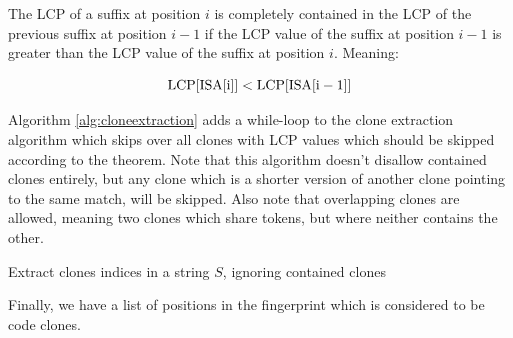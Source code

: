 \begin{theorem} 

    The LCP of a suffix at position $i$ is completely contained in the LCP of the previous
    suffix at position $i - 1$ if the LCP value of the suffix at position $i - 1$ is
    greater than the LCP value of the suffix at position $i$. Meaning:

    $$
    \mathrm{LCP}[{\mathrm{ISA}[{\mathrm{i}}]}] < \mathrm{LCP}[{\mathrm{ISA}[{\mathrm{i} - 1}]}]
    $$

\end{theorem}


Algorithm \ref{alg:cloneextraction} adds a while-loop to the clone extraction algorithm
which skips over all clones with LCP values which should be skipped according to the
theorem. Note that this algorithm doesn't disallow contained clones entirely, but any
clone which is a shorter version of another clone pointing to the same match, will be
skipped. Also note that overlapping clones are allowed, meaning two clones which share
tokens, but where neither contains the other.

\begin{algorithm}[t]
  \SetAlgoLined\DontPrintSemicolon

  \vspace{0.5cm}
  \caption{Extract clones indices in a string $S$, ignoring contained clones}
  \label{alg:cloneextraction}
\end{algorithm}

Finally, we have a list of positions in the fingerprint which is considered to be code
clones.

